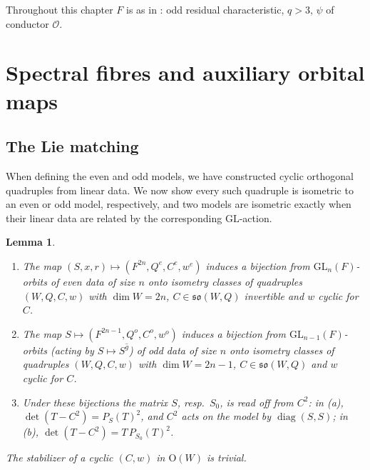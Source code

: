 \documentclass[11pt,oneside,notitlepage]{book}
\numberwithin{equation}{section}
\theoremstyle{plain}
\newtheorem{lemma}[theorem]{Lemma}
\theoremstyle{definition}
\newcommand{\cO}{\mathcal{O}}
\newcommand{\GL}{\mathrm{GL}}
\newcommand{\Ort}{\mathrm{O}}
\newcommand{\so}{\mathfrak{so}}
\newcommand{\diag}{\operatorname{diag}}
\begin{document}
Throughout this chapter $F$ is as in : odd residual characteristic, $q>3$, $\psi$ of conductor $\cO$.

\section{Spectral fibres and auxiliary orbital maps}\label{sec:fibres}

\subsection*{The Lie matching}

When defining the even and odd models, we have constructed cyclic orthogonal quadruples from linear data. We now show every such quadruple is isometric to an even or odd model, respectively, and two models are isometric exactly when their linear data are related by the corresponding \(\GL\)-action.
\begin{lemma}\label{lem:Lie-matching}
	\begin{enumerate}[label=(\alph*)]
		\item The map $(S,x,r)\mapsto(F^{2n},Q^e,C^e,w^e)$ induces a bijection from $\GL_n(F)$-orbits of even data of size $n$ onto isometry classes of quadruples $(W,Q,C,w)$ with $\dim W=2n$, $C\in\so(W,Q)$ invertible and $w$ cyclic for $C$.
		\item The map $S\mapsto(F^{2n-1},Q^o,C^o,w^o)$ induces a bijection from $\GL_{n-1}(F)$-orbits (acting by $S\mapsto S^{\hat g}$) of odd data of size $n$ onto isometry classes of quadruples $(W,Q,C,w)$ with $\dim W=2n-1$, $C\in\so(W,Q)$ and $w$ cyclic for $C$.
		\item Under these bijections the matrix $S$, resp.\ $S_0$, is read off from $C^2$: in (a), $\det(T-C^2)=P_S(T)^2$, and $C^2$ acts on the model by $\diag(S,S)$; in (b), $\det(T-C^2)=T\,P_{S_0}(T)^2$.
	\end{enumerate}
	The stabilizer of a cyclic $(C,w)$ in $\Ort(W)$ is trivial.
\end{lemma}
\end{document}
